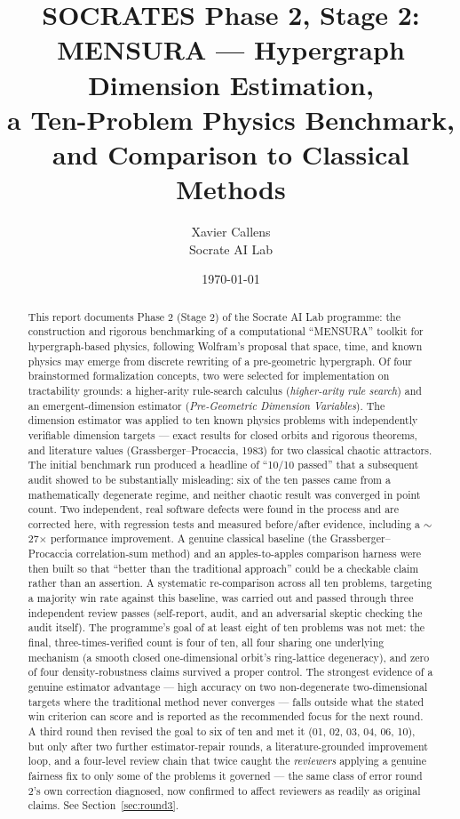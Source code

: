 \documentclass[11pt,a4paper]{article}
\title{\textbf{SOCRATES Phase 2, Stage 2:} \\
\large MENSURA --- Hypergraph Dimension Estimation, \\
a Ten-Problem Physics Benchmark, and Comparison to Classical Methods}
\author{Xavier Callens \\ Socrate AI Lab}
\date{\today}
\begin{document}
\maketitle

\begin{abstract}
This report documents Phase 2 (Stage 2) of the Socrate AI Lab programme:
the construction and rigorous benchmarking of a computational
``MENSURA'' toolkit for hypergraph-based physics, following
Wolfram's proposal that space, time, and known physics may emerge from
discrete rewriting of a pre-geometric hypergraph. Of four brainstormed
formalization concepts, two were selected for implementation on tractability
grounds: a higher-arity rule-search calculus (\emph{higher-arity rule search}) and an emergent-dimension estimator (\emph{Pre-Geometric
Dimension Variables}). The dimension estimator was applied to ten known
physics problems with independently verifiable dimension targets --- exact
results for closed orbits and rigorous theorems, and literature values
(Grassberger--Procaccia, 1983) for two classical chaotic attractors. The
initial benchmark run produced a headline of ``10/10 passed'' that a
subsequent audit showed to be substantially misleading: six of the ten
passes came from a mathematically degenerate regime, and neither chaotic
result was converged in point count. Two independent, real software defects
were found in the process and are corrected here, with regression tests and
measured before/after evidence, including a $\sim$27$\times$ performance
improvement. A genuine classical baseline (the Grassberger--Procaccia
correlation-sum method) and an apples-to-apples comparison harness were then
built so that ``better than the traditional approach'' could be a checkable
claim rather than an assertion. A systematic re-comparison across all ten
problems, targeting a majority win rate against this baseline, was carried
out and passed through three independent review passes (self-report,
audit, and an adversarial skeptic checking the audit itself). The
programme's goal of at least eight of ten problems was not met: the final,
three-times-verified count is four of ten, all four sharing one underlying
mechanism (a smooth closed one-dimensional orbit's ring-lattice
degeneracy), and zero of four density-robustness claims survived a proper
control. The strongest evidence of a genuine estimator advantage --- high
accuracy on two non-degenerate two-dimensional targets where the
traditional method never converges --- falls outside what the stated win
criterion can score and is reported as the recommended focus for the next
round. A third round then revised the goal to six of ten and met it (01,
02, 03, 04, 06, 10), but only after two further estimator-repair rounds, a
literature-grounded improvement loop, and a four-level review chain that
twice caught the \emph{reviewers} applying a genuine fairness fix to only
some of the problems it governed --- the same class of error round 2's own
correction diagnosed, now confirmed to affect reviewers as readily as
original claims. See Section~\ref{sec:round3}.
\end{abstract}
\end{document}
